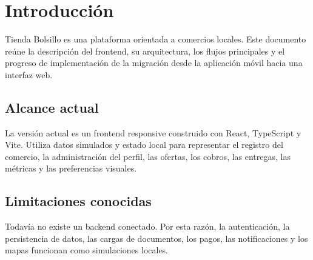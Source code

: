 \section{Introducción}

Tienda Bolsillo es una plataforma orientada a comercios locales. Este documento reúne la descripción del frontend, su arquitectura, los flujos principales y el progreso de implementación de la migración desde la aplicación móvil hacia una interfaz web.

\subsection{Alcance actual}

La versión actual es un frontend responsive construido con React, TypeScript y Vite. Utiliza datos simulados y estado local para representar el registro del comercio, la administración del perfil, las ofertas, los cobros, las entregas, las métricas y las preferencias visuales.

\subsection{Limitaciones conocidas}

Todavía no existe un backend conectado. Por esta razón, la autenticación, la persistencia de datos, las cargas de documentos, los pagos, las notificaciones y los mapas funcionan como simulaciones locales.
